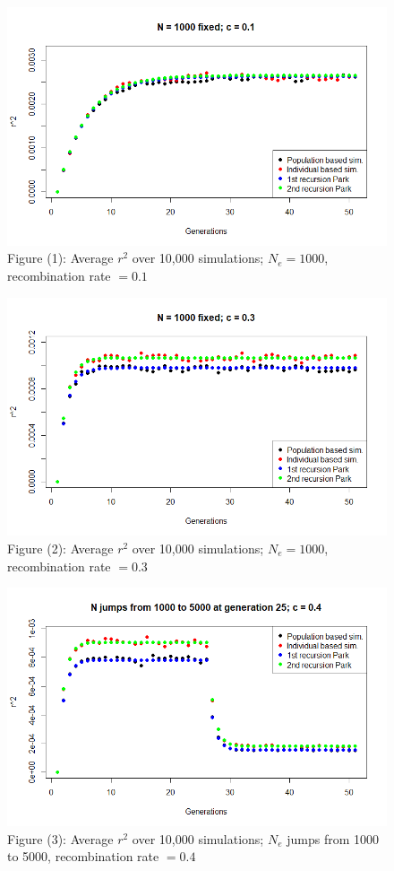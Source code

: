\documentclass[a4paper,12pt]{article}
\begin{document}
\begin{figure}[H]
    \centering
    \includegraphics[scale=0.7]{1.png}%
    \caption*{Figure (1): Average $r^2$ over 10,000 simulations; $N_e = 1000$, recombination rate $= 0.1$}%
\end{figure}%

\begin{figure}[H]
    \centering
    \includegraphics[scale=0.7]{2.png}%
    \caption*{Figure (2): Average $r^2$ over 10,000 simulations; $N_e = 1000$, recombination rate $= 0.3$}%
\end{figure}%

\begin{figure}[H]
    \centering
    \includegraphics[scale=0.7]{3.png}%
    \caption*{Figure (3): Average $r^2$ over 10,000 simulations; $N_e$ jumps from 1000 to 5000, recombination rate $= 0.4$}%
\end{figure}%
\pagebreak
\end{document}
